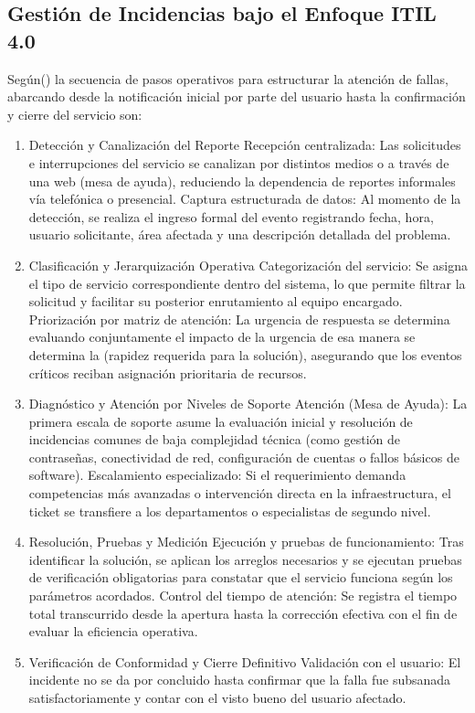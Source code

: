 \subsection{Gestión de Incidencias bajo el Enfoque ITIL 4.0 }

Según(\cite{torres2025aplicativo}) la secuencia de pasos operativos para estructurar la atención de fallas, abarcando desde la notificación inicial por parte del usuario hasta la confirmación y cierre del servicio son:
\begin{enumerate}
	\item Detección y Canalización del Reporte
	Recepción centralizada: Las solicitudes e interrupciones del servicio se canalizan por distintos medios o a través de una web (mesa de ayuda), reduciendo la dependencia de reportes informales vía telefónica o presencial.
	Captura estructurada de datos: Al momento de la detección, se realiza el ingreso formal del evento registrando fecha, hora, usuario solicitante, área afectada y una descripción detallada del problema.
	
	\item Clasificación y Jerarquización Operativa
	Categorización del servicio: Se asigna el tipo de servicio correspondiente dentro del sistema, lo que permite filtrar la solicitud y facilitar su posterior enrutamiento al equipo encargado.
	Priorización por matriz de atención: La urgencia de respuesta se determina evaluando conjuntamente el impacto de la urgencia de esa manera se determina la (rapidez requerida para la solución), asegurando que los eventos críticos reciban asignación prioritaria de recursos.
	
	\item Diagnóstico y Atención por Niveles de Soporte
	Atención (Mesa de Ayuda): La primera escala de soporte asume la evaluación inicial y resolución de incidencias comunes de baja complejidad técnica (como gestión de contraseñas, conectividad de red, configuración de cuentas o fallos básicos de software).
	Escalamiento especializado: Si el requerimiento demanda competencias más avanzadas o intervención directa en la infraestructura, el ticket se transfiere a los departamentos o especialistas de segundo nivel.
	
	\item Resolución, Pruebas y Medición
	Ejecución y pruebas de funcionamiento: Tras identificar la solución, se aplican los arreglos necesarios y se ejecutan pruebas de verificación obligatorias para constatar que el servicio funciona según los parámetros acordados.
	Control del tiempo de atención: Se registra el tiempo total transcurrido desde la apertura hasta la corrección efectiva con el fin de evaluar la eficiencia operativa.
	
	\item Verificación de Conformidad y Cierre Definitivo
	Validación con el usuario: El incidente no se da por concluido hasta confirmar que la falla fue subsanada satisfactoriamente y contar con el visto bueno del usuario afectado.
\end{enumerate}

